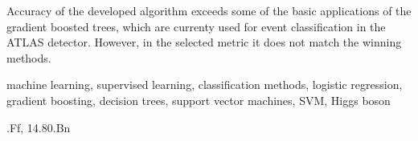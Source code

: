 Accuracy of the developed algorithm exceeds some of the basic applications of the gradient boosted trees, which are currenty used for event classification in the ATLAS detector. However, in the selected metric it does not match the winning methods.
\vspace{1.3cm}

\vspace{0.1cm}

\noindent machine learning, supervised learning, classification methods, logistic regression, gradient boosting, decision trees, support vector machines, SVM, Higgs boson
\vspace{1.3cm}

\vspace{0.1cm} 

.Ff, 14.80.Bn

\newpage

\renewcommand\thepage{} 
\tableofcontents 
\renewcommand\thepage{\arabic{page}}
\thispagestyle{empty}


\newpage

\mbox{}
\thispagestyle{empty}
\newpage

\setcounter{page}{1}


\thispagestyle{empty}
\newpage


